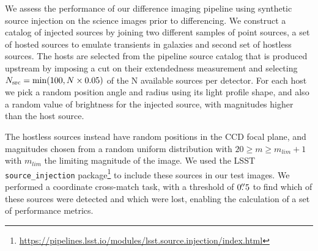 We assess the performance of our difference imaging \gls{pipeline} using synthetic source injection on the science images prior to differencing.
We construct a catalog of injected sources by joining two different samples of point sources, a set of hosted sources to emulate transients in galaxies and second set of hostless sources.
The hosts are selected from the pipeline source catalog that is produced upstream by imposing a cut on their extendedness measurement and selecting $N_{\rm src}={\rm min}(100, N\times0.05)$ of the N available sources per detector.
For each host we pick a random position angle and radius using its light profile \gls{shape}, and also a random value of brightness for the injected source, with magnitudes higher than the host source.

The hostless sources instead have random positions in the \gls{CCD} focal plane, and magnitudes chosen from a random uniform distribution with $20 \geq m \geq m_{lim} + 1$  with $m_{lim}$ the limiting magnitude of the image.
We used the \gls{LSST}  \texttt{source\_injection} package\footnote{\url{https://pipelines.lsst.io/modules/lsst.source.injection/index.html}} to include these sources in our test images.
We performed a coordinate cross-match task, with a threshold of $0\mbox{$.\!\!^{\prime\prime}$}5$ to find which of these sources were detected and which were lost, enabling the calculation of a set of performance metrics.

